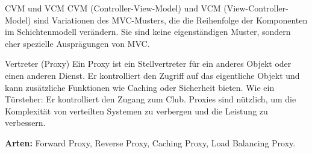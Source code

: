 \documentclass{beamer}
\begin{document}
\begin{frame}{CVM und VCM}
    CVM (Controller-View-Model) und VCM (View-Controller-Model) sind Variationen des MVC-Musters, die die Reihenfolge der Komponenten im Schichtenmodell verändern.  Sie sind keine eigenständigen Muster, sondern eher spezielle Ausprägungen von MVC.
\end{frame}


\begin{frame}{Vertreter (Proxy)}
    Ein Proxy ist ein Stellvertreter für ein anderes Objekt oder einen anderen Dienst.  Er kontrolliert den Zugriff auf das eigentliche Objekt und kann zusätzliche Funktionen wie Caching oder Sicherheit bieten.  Wie ein Türsteher: Er kontrolliert den Zugang zum Club.  Proxies sind nützlich, um die Komplexität von verteilten Systemen zu verbergen und die Leistung zu verbessern.

    \textbf{Arten:} Forward Proxy, Reverse Proxy, Caching Proxy, Load Balancing Proxy.
\end{frame}
\end{document}
